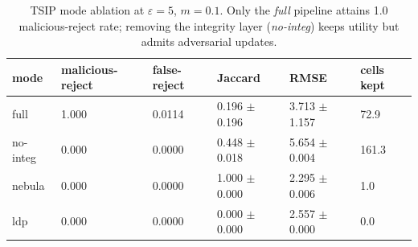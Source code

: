 \begin{table}[t]
\centering
\caption{TSIP mode ablation at $\varepsilon{=}5$, $m{=}0.1$. Only the \emph{full} pipeline attains 1.0 malicious-reject rate; removing the integrity layer (\emph{no-integ}) keeps utility but admits adversarial updates.}
\label{tab:mode-ablation}
\small
\begin{tabular}{llllll}
\toprule
mode & malicious-reject & false-reject & Jaccard & RMSE & cells kept \\
\midrule
full & 1.000 & 0.0114 & 0.196 $\pm$ 0.196 & 3.713 $\pm$ 1.157 & 72.9 \\
no-integ & 0.000 & 0.0000 & 0.448 $\pm$ 0.018 & 5.654 $\pm$ 0.004 & 161.3 \\
nebula & 0.000 & 0.0000 & 1.000 $\pm$ 0.000 & 2.295 $\pm$ 0.006 & 1.0 \\
ldp & 0.000 & 0.0000 & 0.000 $\pm$ 0.000 & 2.557 $\pm$ 0.000 & 0.0 \\
\bottomrule
\end{tabular}
\end{table}
